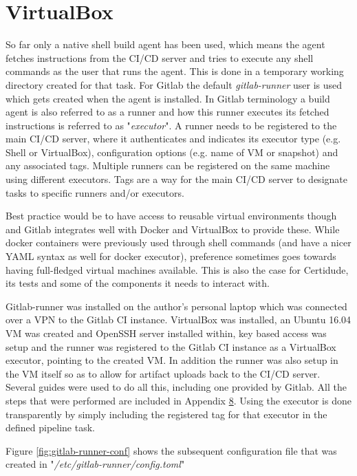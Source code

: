 \section{VirtualBox}\label{vbox-cert}
So far only a native shell build agent has been used, which means the agent fetches instructions from the CI/CD server and tries to execute any shell commands as the user that runs the agent. This is done in a temporary working directory created for that task. For Gitlab the default \textit{gitlab-runner} user is used which gets created when the agent is installed.\cite{gitlab-runner} In Gitlab terminology a build agent is also referred to as a runner and how this runner executes its fetched instructions is referred to as "\textit{executor}". A runner needs to be registered to the main CI/CD server, where it authenticates and indicates its executor type (e.g. Shell or VirtualBox), configuration options (e.g. name of VM or snapshot) and any associated tags. Multiple runners can be registered on the same machine using different executors. Tags are a way for the main CI/CD server to designate tasks to specific runners and/or executors. 

Best practice would be to have access to reusable virtual environments though and Gitlab integrates well with Docker and VirtualBox to provide these. While docker containers were previously used through shell commands (and have a nicer YAML syntax as well for docker executor), preference sometimes goes towards having full-fledged virtual machines available. This is also the case for Certidude, its tests and some of the components it needs to interact with.

Gitlab-runner was installed on the author's personal laptop which was connected over a VPN to the Gitlab CI instance.\cite{gitlab-runner} VirtualBox was installed, an Ubuntu 16.04 VM was created and OpenSSH server installed within, key based access was setup and the runner was registered to the Gitlab CI instance as a VirtualBox executor, pointing to the created VM. In addition the runner was also setup in the VM itself so as to allow for artifact uploads back to the CI/CD server. Several guides were used to do all this, including one provided by Gitlab.\cite{vbox-cli, vbox-oracle, gitlab-runner} All the steps that were performed are included in Appendix \hyperref[chapter:appendix-vbox]{8}. Using the executor is done transparently by simply including the registered tag for that executor in the defined pipeline task.

Figure \ref{fig:gitlab-runner-conf} shows the subsequent configuration file that was created in "\textit{/etc/gitlab-runner/config.toml}"

